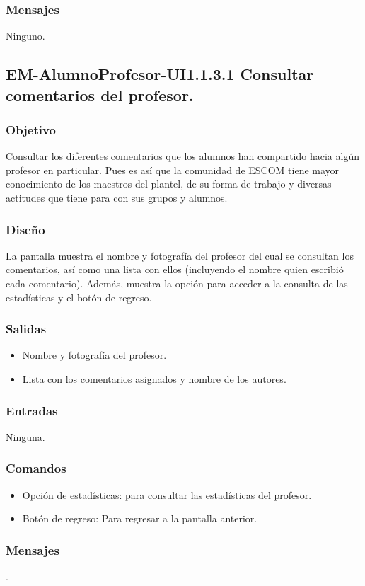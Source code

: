 \subsubsection{Mensajes}
	\noindent
	Ninguno.


\subsection{EM-AlumnoProfesor-UI1.1.3.1 Consultar comentarios del profesor.}

\subsubsection{Objetivo}
	\noindent
	Consultar los diferentes comentarios que los alumnos han compartido hacia algún profesor en particular. Pues es así que la comunidad de ESCOM tiene mayor conocimiento de los maestros del plantel, de su forma de
	trabajo y diversas actitudes que tiene para con sus grupos y alumnos.

\subsubsection{Diseño}
	\noindent
	La pantalla muestra el nombre y fotografía del profesor del cual se consultan los comentarios, así como una lista con ellos (incluyendo el nombre quien escribió cada comentario).
	Además, muestra la opción para acceder a la consulta de las estadísticas y el botón de regreso.

\pagebreak
{}

\subsubsection{Salidas}
	\begin{itemize}
		\item Nombre y fotografía del profesor.
		\item Lista con los comentarios asignados y nombre de los autores.
	\end{itemize}

\subsubsection{Entradas}
	\noindent
	Ninguna.

\subsubsection{Comandos}
	\begin{itemize}
		\item Opción de estadísticas: para consultar las estadísticas del profesor.
		\item Botón de regreso: Para regresar a la pantalla anterior.
	\end{itemize}

\subsubsection{Mensajes}
	\noindent
	.





